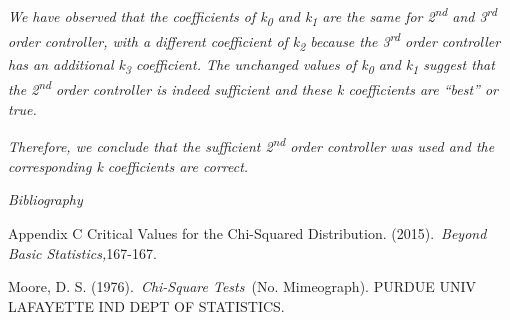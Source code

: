 \documentclass[]{article}
\begin{document}
\emph{We have observed that the coefficients of k\textsubscript{0} and
k\textsubscript{1} are the same for 2\textsuperscript{nd} and
3\textsuperscript{rd} order controller, with a different coefficient of
k\textsubscript{2} because the 3\textsuperscript{rd} order controller
has an additional k\textsubscript{3} coefficient. The unchanged values
of k\textsubscript{0} and k\textsubscript{1} suggest that the
2\textsuperscript{nd} order controller is indeed sufficient and these k
coefficients are ``best'' or true.}

\emph{Therefore, we conclude that the sufficient 2\textsuperscript{nd}
order controller was used and the corresponding k coefficients are
correct.}

\emph{\emph{Bibliography}}

Appendix C Critical Values for the Chi-Squared Distribution.
(2015).~\emph{Beyond Basic Statistics,}167-167.

Moore, D. S. (1976).~\emph{Chi-Square Tests}~(No. Mimeograph). PURDUE
UNIV LAFAYETTE IND DEPT OF STATISTICS.
\end{document}
